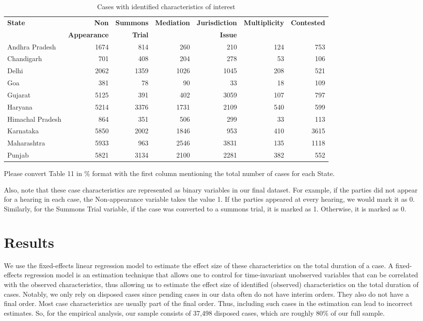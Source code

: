 \documentclass[12pt,a4paper]{article}
\begin{document}
\begin{table}[!ht]
\caption{Cases with identified characteristics of interest}
\label{tab:case_chars}
\centering
\footnotesize
\begin{tabular}{@{}lrrrrrr@{}}
\toprule
\textbf{State} & \textbf{Non} & \textbf{Summons} & \textbf{Mediation} & \textbf{Jurisdiction} & \textbf{Multiplicity} & \textbf{Contested} \\
& \textbf{Appearance} & \textbf{Trial} & & \textbf{Issue} & &\\
\midrule
Andhra Pradesh & 1674 & 814 & 260 & 210 & 124 & 753 \\
Chandigarh & 701 & 408 & 204 & 278 & 53 & 106 \\
Delhi & 2062 & 1359 & 1026 & 1045 & 208 & 521 \\
Goa & 381 & 78 & 90 & 33 & 18 & 109 \\
Gujarat & 5125 & 391 & 402 & 3059 & 107 & 797 \\
Haryana & 5214 & 3376 & 1731 & 2109 & 540 & 599 \\
Himachal Pradesh & 864 & 351 & 506 & 299 & 33 & 113 \\
Karnataka & 5850 & 2002 & 1846 & 953 & 410 & 3615 \\
Maharashtra & 5933 & 963 & 2546 & 3831 & 135 & 1118 \\
Punjab & 5821 & 3134 & 2100 & 2281 & 382 & 552 \\
\bottomrule
\end{tabular}
\end{table}

{\color{red} Please convert Table 11 in \% format with the first column mentioning the total number of cases for each State.}

Also, note that these case characteristics are represented as binary variables in our final dataset. For example, if the parties did not appear for a hearing in each case, the Non-appearance variable takes the value 1. If the parties appeared at every hearing, we would mark it as 0. Similarly, for the Summons Trial variable, if the case was converted to a summons trial, it is marked as 1. Otherwise, it is marked as 0.

\section{Results}
\label{sec:results}

We use the fixed-effects linear regression model to estimate the effect size of these characteristics on the total duration of a case. A fixed-effects regression model is an estimation technique that allows one to control for time-invariant unobserved variables that can be correlated with the observed characteristics, thus allowing us to estimate the effect size of identified (observed) characteristics on the total duration of cases. Notably, we only rely on disposed cases since pending cases in our data often do not have interim orders. They also do not have a final order. Most case characteristics are usually part of the final order. Thus, including such cases in the estimation can lead to incorrect estimates. So, for the empirical analysis, our sample consists of 37,498 disposed cases, which are roughly 80\% of our full sample.
\end{document}
